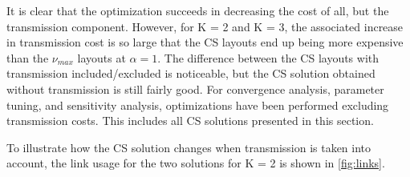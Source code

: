 \documentclass[a4paper, 5p, sort&compress]{elsarticle}%
\begin{document}
It is clear that the optimization succeeds in decreasing the cost of
all, but the transmission component. However, for K = 2 and K = 3, the
associated increase in transmission cost is so large that the CS
layouts end up being more expensive than the $\nu_{max}$ layouts at
$\alpha = 1$. The difference between the CS layouts with transmission
included/excluded is noticeable, but the CS solution obtained without
transmission is still fairly good. For convergence analysis, parameter
tuning, and sensitivity analysis, optimizations have been performed
excluding transmission costs. This includes all CS solutions presented
in this section.

To illustrate how the CS solution changes when transmission is taken
into account, the link usage for the two solutions for K = 2 is shown
in \cref{fig:links}.
\end{document}
